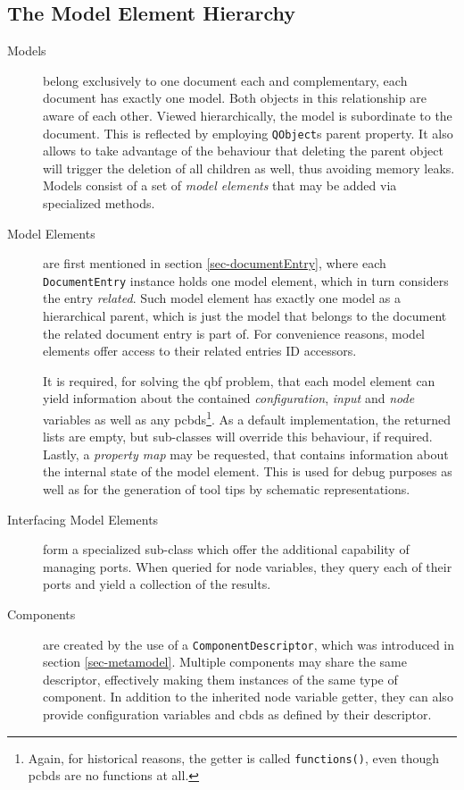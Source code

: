 \subsection{The Model Element Hierarchy}
	\label{sec-model-hierarchy}

\begin{description}
	\item[Models] belong exclusively to one document each and complementary, each document has exactly one model. 
	Both objects in this relationship are aware of each other.
	Viewed hierarchically, the model is subordinate to the document.
	This is reflected by employing \texttt{QObject}s parent property.
	It also allows to take advantage of the behaviour that deleting the parent object will trigger the deletion of all children as well, thus avoiding memory leaks.
	Models consist of a set of \emph{model elements} that may be added via specialized methods. 
	
	\item[Model Elements] are first mentioned in section \ref{sec-documentEntry}, where each \texttt{DocumentEntry} instance holds one model element, which in turn considers the entry \emph{related}.
	Such model element has exactly one model as a hierarchical parent, which is just the model that belongs to the document the related document entry is part of.
	For convenience reasons, model elements offer access to their related entries ID accessors.
	
	It is required, for solving the \gls{qbf} problem, that each model element can yield information about the contained \emph{configuration}, \emph{input} and \emph{node} variables as well as any \glspl{pcbd}\footnote{
		Again, for historical reasons, the getter is called \texttt{functions()}, even though \glspl{pcbd} are no functions at all.	
	}.
	As a default implementation, the returned lists are empty, but sub-classes will override this behaviour, if required.
	Lastly, a \emph{property map} may be requested, that contains information about the internal state of the model element.
	This is used for debug purposes as well as for the generation of tool tips by schematic representations.
	
	\item[Interfacing Model Elements] form a specialized sub-class which offer the additional capability of managing ports.
	When queried for node variables, they query each of their ports and yield a collection of the results.
	
	\item[Components] are created by the use of a \texttt{ComponentDescriptor}, which was introduced in section \ref{sec-metamodel}.
	Multiple components may share the same descriptor, effectively making them instances of the same type of component.
	In addition to the inherited node variable getter, they can also provide configuration variables and \glspl{cbd} as defined by their descriptor.
	

\end{description}
